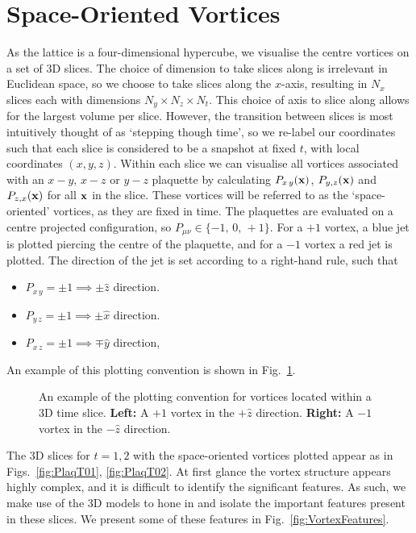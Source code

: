 \section{Space-Oriented Vortices}
As the lattice is a four-dimensional hypercube, we visualise the centre vortices on a set of 3D slices. The choice of dimension to take slices along is irrelevant in Euclidean space, so we choose to take slices along the $x$-axis, resulting in $N_x$ slices each with dimensions $N_y\times N_z\times N_t$. This choice of axis to slice along allows for the largest volume per slice.  However, the transition between slices is most intuitively thought of as `stepping though time', so we re-label our coordinates such that each slice is considered to be a snapshot at fixed $t$, with local coordinates $(x,y,z)$. Within each slice we can visualise all vortices associated with an $x-y$, $x-z$ or $y-z$ plaquette by calculating $P_{x\,y}(\bf{x})$, $P_{y,z}(\bf{x})$ and $P_{z,x}(\bf{x})$ for all $\bf{x}$ in the slice. These vortices will be referred to as the `space-oriented' vortices, as they are fixed in time. The plaquettes are evaluated on a centre projected configuration, so $P_{\mu\nu}\in \lbrace -1,\,0,\,+1\rbrace$. For a $+1$ vortex, a blue jet is plotted piercing the centre of the plaquette, and for a $-1$ vortex a red jet is plotted. The direction of the jet is set according to a right-hand rule, such that
\begin{itemize}[leftmargin=*,itemsep=0pt,labelsep=12pt]
\item $P_{x\,y}=\pm 1\implies \pm\hat{z}$ direction.
\item $P_{y\,z}=\pm 1\implies \pm\hat{x}$ direction.
\item $P_{x\,z}=\pm 1\implies \mp\hat{y}$ direction,
\end{itemize}
An example of this plotting convention is shown in Fig.~\ref{fig:SpacialVortices}.\\

\begin{figure}[ht]
\centering
  \begin{subfigure}[b]{0.3\textwidth}
  \centering
  
  \end{subfigure}
  \hfill
  \begin{subfigure}[b]{0.55\textwidth}
  \centering
  
  \end{subfigure}             
  \caption{An example of the plotting convention for vortices located within a 3D time slice. \textbf{Left:} A $+1$ vortex in the $+\hat{z}$ direction. \textbf{Right:} A $-1$ vortex in the $-\hat{z}$ direction.}
  \label{fig:SpacialVortices}
\end{figure}
%
The 3D slices for $t=1,2$ with the space-oriented vortices plotted appear as in Figs.~\ref{fig:PlaqT01}, \ref{fig:PlaqT02}. At first glance the vortex structure appears highly complex, and it is difficult to identify the significant features. As such, we make use of the 3D models to hone in and isolate the important features present in these slices. We present some of these features in Fig.~\ref{fig:VortexFeatures}.\\

